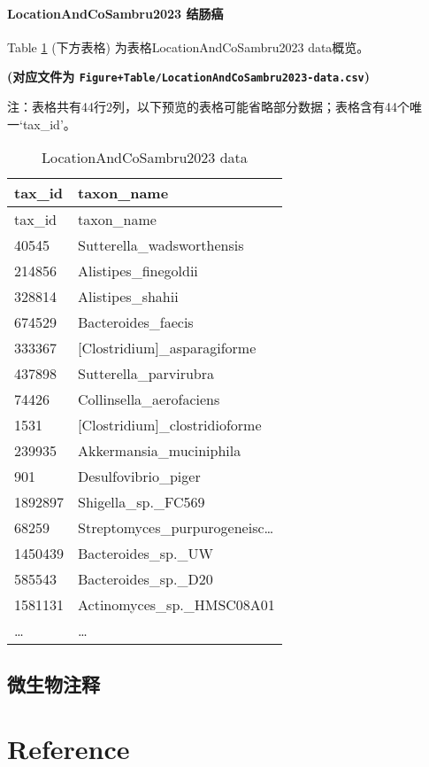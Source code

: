 \documentclass[
]{article}
\begin{document}
\hypertarget{locationandcosambru2023-ux7ed3ux80a0ux764c}{%
\paragraph{LocationAndCoSambru2023 结肠癌}\label{locationandcosambru2023-ux7ed3ux80a0ux764c}}

Table \ref{tab:LocationAndCoSambru2023-data} (下方表格) 为表格LocationAndCoSambru2023 data概览。

\textbf{(对应文件为 \texttt{Figure+Table/LocationAndCoSambru2023-data.csv})}

\begin{center}\begin{tcolorbox}[colback=gray!10, colframe=gray!50, width=0.9\linewidth, arc=1mm, boxrule=0.5pt]注：表格共有44行2列，以下预览的表格可能省略部分数据；表格含有44个唯一`tax\_id'。
\end{tcolorbox}
\end{center}

\begin{longtable}[]{@{}ll@{}}
\caption{\label{tab:LocationAndCoSambru2023-data}LocationAndCoSambru2023 data}\tabularnewline
\toprule
tax\_id & taxon\_name\tabularnewline
\midrule
\endfirsthead
\toprule
tax\_id & taxon\_name\tabularnewline
\midrule
\endhead
40545 & Sutterella\_wadsworthensis\tabularnewline
214856 & Alistipes\_finegoldii\tabularnewline
328814 & Alistipes\_shahii\tabularnewline
674529 & Bacteroides\_faecis\tabularnewline
333367 & {[}Clostridium{]}\_asparagiforme\tabularnewline
437898 & Sutterella\_parvirubra\tabularnewline
74426 & Collinsella\_aerofaciens\tabularnewline
1531 & {[}Clostridium{]}\_clostridioforme\tabularnewline
239935 & Akkermansia\_muciniphila\tabularnewline
901 & Desulfovibrio\_piger\tabularnewline
1892897 & Shigella\_sp.\_FC569\tabularnewline
68259 & Streptomyces\_purpurogeneisc\ldots{}\tabularnewline
1450439 & Bacteroides\_sp.\_UW\tabularnewline
585543 & Bacteroides\_sp.\_D20\tabularnewline
1581131 & Actinomyces\_sp.\_HMSC08A01\tabularnewline
\ldots{} & \ldots{}\tabularnewline
\bottomrule
\end{longtable}

\hypertarget{ux5faeux751fux7269ux6ce8ux91ca}{%
\subsection{微生物注释}\label{ux5faeux751fux7269ux6ce8ux91ca}}

\hypertarget{bibliography}{%
\section*{Reference}\label{bibliography}}
\end{document}
